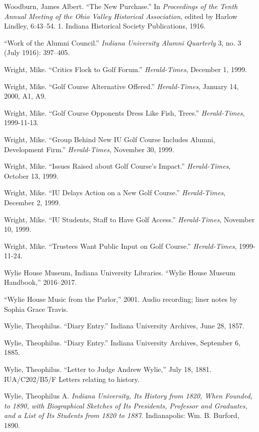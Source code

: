 \documentclass[
  american,
  letterpaper,
]{scrreprt}
\newlength{\cslhangindent}
\newenvironment{CSLReferences}[2] %
 {\begin{list}{}{%
  \setlength{\itemindent}{0pt}
  \setlength{\leftmargin}{0pt}
  \setlength{\parsep}{0pt}
  \ifodd #1
   \setlength{\leftmargin}{\cslhangindent}
   \setlength{\itemindent}{-1\cslhangindent}
  \fi
  \setlength{\itemsep}{#2\baselineskip}}}
 {\end{list}}
\begin{document}
\begin{CSLReferences}{1}{0}
Woodburn, James Albert. {``The New Purchase.''} In \emph{Proceedings of
the Tenth Annual Meeting of the Ohio Valley Historical Association},
edited by Harlow Lindley, 6:43--54. 1. Indiana Historical Society
Publications, 1916.

{``Work of the Alumni Council.''} \emph{Indiana University Alumni
Quarterly} 3, no. 3 (July 1916): 397--405.

Wright, Mike. {``Critics Flock to Golf Forum.''} \emph{Herald-Times},
December 1, 1999.

Wright, Mike. {``Golf Course Alternative Offered.''}
\emph{Herald-Times}, January 14, 2000, A1, A9.

Wright, Mike. {``Golf Course Opponents Dress Like Fish, Trees.''}
\emph{Herald-Times}, 1999-11-13.

Wright, Mike. {``Group Behind New IU Golf Course Includes Alumni,
Development Firm.''} \emph{Herald-Times}, November 30, 1999.

Wright, Mike. {``Issues Raised about Golf Course's Impact.''}
\emph{Herald-Times}, October 13, 1999.

Wright, Mike. {``IU Delays Action on a New Golf Course.''}
\emph{Herald-Times}, December 2, 1999.

Wright, Mike. {``IU Students, Staff to Have Golf Access.''}
\emph{Herald-Times}, November 10, 1999.

Wright, Mike. {``Trustees Want Public Input on Golf Course.''}
\emph{Herald-Times}, 1999-11-24.

Wylie House Museum, Indiana University Libraries. {``Wylie House Museum
Handbook,''} 2016--2017.

{``Wylie House Music from the Parlor,''} 2001. Audio recording; liner
notes by Sophia Grace Travis.

Wylie, Theophilus. {``Diary Entry.''} Indiana University Archives, June
28, 1857.

Wylie, Theophilus. {``Diary Entry.''} Indiana University Archives,
September 6, 1885.

Wylie, Theophilus. {``Letter to Judge Andrew Wylie,''} July 18, 1881.
IUA/C202/B5/F Letters relating to history.

Wylie, Theophilus A. \emph{Indiana University, Its History from 1820,
When Founded, to 1890, with Biographical Sketches of Its Presidents,
Professor and Graduates, and a List of Its Students from 1820 to 1887}.
Indianapolis: Wm. B. Burford, 1890.

\end{CSLReferences}
\end{document}

